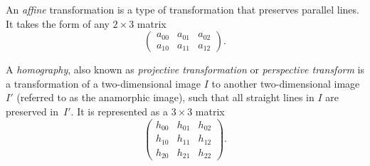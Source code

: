 \documentclass[11pt, oneside, reqno]{book}
\begin{document}
\begin{definition}%
	\label{def:affine}
	An \textit{affine} transformation is a type of transformation that preserves parallel lines. It takes the form of any $2 \times 3$ matrix
	\[
	\begin{pmatrix}
	a_{00} & a_{01} & a_{02} \\
	a_{10} & a_{11} & a_{12}
	\end{pmatrix}.
	\]
\end{definition}




\begin{definition}%
	\label{def:homography}
	A \textit{homography}, also known as \textit{projective transformation} or \textit{perspective transform} is a transformation of a two-dimensional image $I$ to another two-dimensional image $I'$ (referred to as the anamorphic image), such that all straight lines in $I$ are preserved in~$I'$. It is represented as a $3 \times 3$ matrix
	\[
	\begin{pmatrix}
	h_{00} & h_{01} & h_{02} \\
	h_{10} & h_{11} & h_{12} \\
	h_{20} & h_{21} & h_{22}
	\end{pmatrix}.
	\]
\end{definition} 

\end{document}
